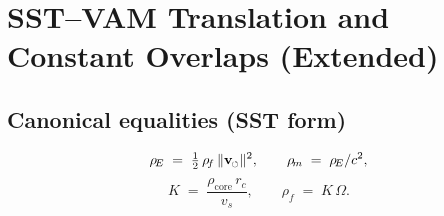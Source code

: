 \documentclass[11pt]{article}
\newcommand{\swirlarrow}{%
	\mathchoice{\mkern-2mu\scriptstyle\boldsymbol{\circlearrowleft}}%
	{\mkern-2mu\scriptstyle\boldsymbol{\circlearrowleft}}%
	{\mkern-2mu\scriptscriptstyle\boldsymbol{\circlearrowleft}}%
	{\mkern-2mu\scriptscriptstyle\boldsymbol{\circlearrowleft}}%
}
\newcommand{\vswirl}{\mathbf{v}_{\swirlarrow}}
\newcommand{\vscore}{v_s}                                %
\newcommand{\vnorm}{\lVert \vswirl \rVert}               %
\newcommand{\rhoF}{\rho_{\!f}}                           %
\newcommand{\rhoE}{\rho_{\!E}}                           %
\newcommand{\rhoM}{\rho_{\!m}}                           %
\newcommand{\rhoC}{\rho_{\mathrm{core}}} %
\begin{document}
	\titlepageOpen

	\begin{abstract}
		\noindent
		This note provides a rigorous nomenclature concordance between the legacy VAM presentation and the Swirl--String Theory (SST) house style. It establishes a one-to-one mapping of symbols and terminology while preserving the underlying kinematics, operators, and calibrated constants. In particular, it fixes the canonical SST equalities
		\[
			\rhoE=\tfrac12\,\rhoF\,\vnorm^{2},\qquad
			\rhoM=\rhoE/c^{2},\qquad
			K=\frac{\rhoC\, r_c}{\vswirl},\quad
			\rhoF=K\,\Omega,
		\]
		and records that all published numerical values for $\vswirl$, $r_c$, $\rhoC$, the background density, and the sectoral force bounds carry over unchanged. The document includes compact translation tables (fields/kinematics/operators; densities/velocities/coarse--graining; global scales) and a minimal macro layer (\verb|\rhoF|, \verb|\rhoE|, \verb|\rhoM|, \verb|\rhoC|, \verb|\vswirl|, \verb|\vnorm|) to prevent notation drift in large projects. Legacy wording is restricted to historical citations; narrative prose adopts the neutral SST vocabulary (e.g., \emph{foliation}, \emph{swirl string}) without altering the mathematics. Compatibility is ensured both for standalone use (title page + metadata) and for modular inclusion (\verb|\providecommand| guards and no additional package requirements). The result is a drop-in “translation guide’’ that guarantees dimensional consistency, unambiguous symbol usage, and reproducible cross-referencing across manuscripts that span the VAM$\to$SST transition.


	\end{abstract}

	\titlepageClose
	\fi

	\ifdefined\standalonechapter
	\section{\papertitle}
	\else
	\fi



\section{SST--VAM Translation and Constant Overlaps (Extended)}

	\subsection*{Canonical equalities (SST form)}
	\[
		\rhoE \;=\; \tfrac12\,\rhoF\,\vnorm^{2},\qquad
		\rhoM \;=\; \rhoE/c^{2},
	\]
	\[
		K \;=\; \frac{\rhoC\, r_c}{\vscore},\qquad
		\rhoF \;=\; K\,\Omega .
	\]
\end{document}

